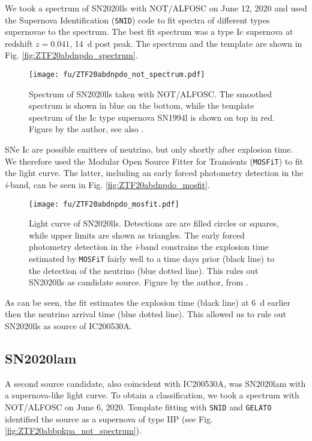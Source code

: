 We took a spectrum of SN2020lls with NOT/ALFOSC on June 12, 2020 and used the Supernova Identification (\texttt{SNID}) code  to fit spectra of different types supernovae to the spectrum. The best fit spectrum was a type Ic supernova at redshift $z=0.041$, \SI{14}{\day} post peak. The spectrum and the template are shown in Fig. \ref{fig:ZTF20abdnpdo_spectrum}. 

\begin{figure}[h!]
    \texttt{[image: fu/ZTF20abdnpdo\_not\_spectrum.pdf]}
    \caption[SN2020lls spectrum]{Spectrum of SN2020lls taken with NOT/ALFOSC. The smoothed spectrum is shown in blue on the bottom, while the template spectrum of the Ic type supernova SN1994l is shown on top in red. Figure by the author, see also \cite{Stein2023a}.}
\end{figure}
SNe Ic are possible emitters of neutrino, but only shortly after explosion time. We therefore used the Modular Open Source Fitter for Transients (\texttt{MOSFiT})  to fit the light curve. The latter, including an early forced photometry detection in the \textit{i}-band, can be seen in Fig. \ref{fig:ZTF20abdnpdo_mosfit}.

\begin{figure}[h!]
    \texttt{[image: fu/ZTF20abdnpdo\_mosfit.pdf]}
    \caption[SN2020lls light curve fit]{Light curve of SN2020lls. Detections are are filled circles or squares, while upper limits are shown as triangles. The early forced photometry detection in the \textit{i}-band constrains the explosion time estimated by \texttt{MOSFiT} fairly well to a time days prior (black line) to the detection of the neutrino (blue dotted line). This rules out SN2020lls as candidate source. Figure by the author, from \cite{Stein2023a}.}
\end{figure}
As can be seen, the fit estimates the explosion time (black line) at \SI{6}{\day} earlier then the neutrino arrival time (blue dotted line). This allowed us to rule out SN2020lls as source of IC200530A.

\subsection{SN2020lam} \label{SN2020lam}
A second source candidate, also coincident with IC200530A, was SN2020lam  with a supernova-like light curve. To obtain a classification, we took a spectrum with NOT/ALFOSC on June 6, 2020. Template fitting with \texttt{SNID} and \texttt{GELATO}  identified the source as a supernova of type IIP (see Fig. \ref{fig:ZTF20abbpkpa_not_spectrum}).

